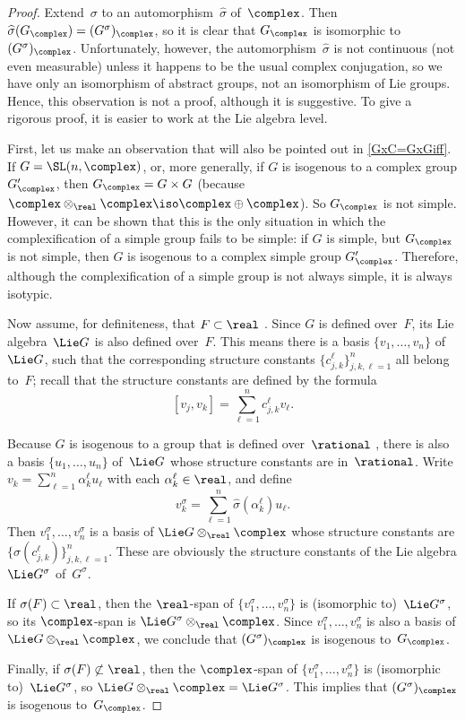 \begin{proof}
 Extend~$\sigma$ to an automorphism~$\widehat\sigma$
of~$\complex$. Then $\widehat\sigma(G_\complex) =
(G^\sigma)_\complex$, so it is clear that $G_\complex$ is isomorphic to $(G^\sigma)_\complex$.
Unfortunately, however, the automorphism~$\widehat\sigma$ is not
continuous (not even measurable) unless it happens to be the
usual complex conjugation, so we have only an isomorphism of
abstract groups, not an isomorphism of Lie groups. Hence, this observation is not
a proof,
although it is suggestive.
To give a rigorous proof, it is easier to work at the Lie algebra
level.

First, let us make an observation that will also be pointed out in \cref{GxC=GxGiff}. If $G = \SL(n,\complex)$, or, more generally, if $G$ is isogenous to a complex group $G'_\complex$, then $G_\complex = G \times G$ (because $\complex \otimes_\real \complex \iso \complex \oplus \complex$). So $G_\complex$ is not simple. However, it can be shown that this is the only situation in which the complexification of a simple group fails to be simple: if $G$ is simple, but $G_\complex$ is not simple, then $G$ is isogenous to a complex simple group $G'_\complex$. 
Therefore, although the complexification of a simple group is not always simple, it is always isotypic.


Now assume, for definiteness, that $F \subset \real$ .
Since $G$ is defined over~$F$, its Lie algebra~$\Lie G$ is also defined over~$F$. This means there is a basis $\{v_1,\ldots,v_n\}$ of~$\Lie G$, such that the corresponding structure constants $\{c_{j,k}^\ell\}_{j,k,\ell=1}^n$ all belong to~$F$; recall that the structure constants are defined by the formula
 	$$ \textstyle [v_j,v_k] = \sum_{\ell=1}^n c_{j,k}^\ell v_\ell .$$
 
 Because $G$ is isogenous to a group that is defined
over~$\rational$ , there is also a basis
$\{u_1,\ldots,u_n\}$ of~$\Lie G$ whose structure
constants are in~$\rational$. Write
 $ v_k = \sum_{\ell=1}^n \alpha_k^\ell u_\ell $
 with each $\alpha_k^\ell \in \real$, and define
 $$ \textstyle v_k^\sigma = \sum_{\ell=1}^n \widehat\sigma(\alpha_k^\ell)
u_\ell . $$
 Then $v_1^\sigma, \ldots, v_n^\sigma$ is a basis of $\Lie G
\otimes_{\real} \complex$ whose structure constants are
$\bigl\{ \sigma(c_{j,k}^\ell) \bigr\}_{j,k,\ell=1}^n$. These
are obviously the structure constants of the Lie algebra $\Lie G^\sigma$ of~$G^\sigma$.

If $\sigma(F) \subset \real$, then the $\real$-span of $\{v_1^\sigma, \ldots, v_n^\sigma\}$ is (isomorphic to)~$\Lie G^\sigma$, so its $\complex$-span is $\Lie G^\sigma
\otimes_{\real} \complex$. Since $v_1^\sigma, \ldots, v_n^\sigma$ is also a basis of $\Lie G
\otimes_{\real} \complex$, we conclude that $(G^\sigma)_\complex$ is isogenous to~$G_\complex$.

Finally, if $\sigma(F) \not\subset \real$, then the $\complex$-span of $\{v_1^\sigma, \ldots, v_n^\sigma\}$ is (isomorphic to)~$\Lie G^\sigma$, so $\Lie G
\otimes_{\real} \complex = \Lie G^\sigma$. This implies that $(G^\sigma)_\complex$ is isogenous to~$G_\complex$.
 \end{proof}

